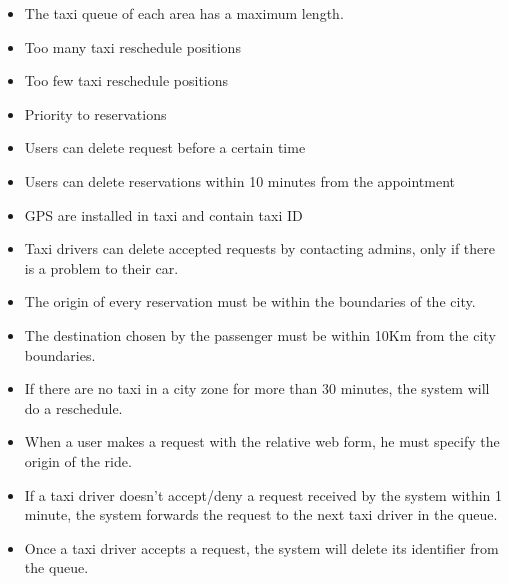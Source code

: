 \begin{itemize}
	\item The taxi queue of each area has a maximum length.
	\item Too many taxi reschedule positions
	\item Too few taxi reschedule positions
	\item Priority to reservations
	\item Users can delete request before a certain time
	\item Users can delete reservations within 10 minutes from the appointment
	\item GPS are installed in taxi and contain taxi ID
	\item Taxi drivers can delete accepted requests by contacting admins, only if there is a problem to their car.
	\item The origin of every reservation must be within the boundaries of the city.
	\item The destination chosen by the passenger must be within 10Km from the city boundaries.
	\item If there are no taxi in a city zone for more than 30 minutes, the system will do a reschedule.
	\item When a user makes a request with the relative web form, he must specify the origin  of the ride.
	\item If a taxi driver doesn't accept/deny a request received by the system within 1 minute, the system forwards the request to the next taxi driver in the queue.
	\item Once a taxi driver accepts a request, the system will delete its identifier from the queue.
\end{itemize}